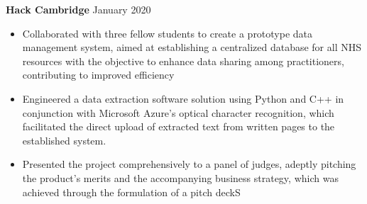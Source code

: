 \documentclass{article}
\begin{document}


\textbf{Hack Cambridge} \hfill January 2020
\begin{itemize}
    \item Collaborated with three fellow students to create a prototype data management system, aimed at establishing a centralized database for all NHS resources with the objective to enhance data sharing among practitioners, contributing to improved efficiency
    \item Engineered a data extraction software solution using Python and C++ in conjunction with Microsoft Azure's optical character recognition, which facilitated the direct upload of extracted text from written pages to the established system.
    \item Presented the project comprehensively to a panel of judges, adeptly pitching the product's merits and the accompanying business strategy, which was achieved through the formulation of a pitch deckS
\end{itemize} \medskip
\end{document}
